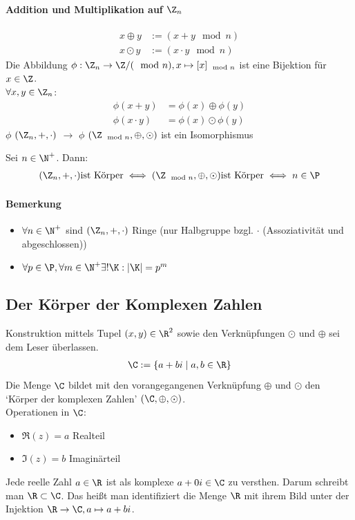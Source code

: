 \paragraph{Addition und Multiplikation auf $\Z_n$}
\begin{align*}
	x\oplus y&:= (x+y\mod n)\\
	x\odot y&:= (x\cdot y\mod n)
\end{align*}
Die Abbildung $\phi: \Z_n\to \Z/(\mod n), x \mapsto [x]_{\mod n}$ ist eine Bijektion für $x \in \Z$.\\
$\forall x,y \in \Z_n$:
\begin{align*}
	\phi(x+y)&=\phi(x)\oplus\phi(y)\\
	\phi(x\cdot y)&=\phi(x)\odot\phi(y)
\end{align*}
$\phi$ $(\Z_n, +, \cdot)$ $\to$ $\phi$ $(\Z_{\mod n}, \oplus, \odot)$ ist ein Isomorphismus
\begin{theorem}
	Sei $n\in\N^+$. Dann:
	\begin{align*}
		(\Z_n,+,\cdot) \text{ist Körper} \iff (\Z_{\mod n}, \oplus, \odot) \text{ist Körper} \iff n\in\P
	\end{align*}
\end{theorem}
\paragraph{Bemerkung}
\begin{itemize}
	\item $\forall n \in \N^+$ sind $(\Z_n,+,\cdot)$ Ringe (nur Halbgruppe bzgl. $\cdot$ (Assoziativität und abgeschlossen))
	\item $\forall p \in \P, \forall m \in \N^+ \exists! \K: |\K|=p^m$
\end{itemize}
\subsection{Der Körper der Komplexen Zahlen}
Konstruktion mittels Tupel $(x,y)\in \R^2$ sowie den Verknüpfungen $\odot$ und $\oplus$ sei dem Leser überlassen.
\begin{align*}
	\C := \{a+bi \mid a,b\in \R\}
\end{align*}
Die Menge $\C$ bildet mit den vorangegangenen Verknüpfung $\oplus$ und $\odot$ den `Körper der komplexen Zahlen' $(\C, \oplus, \odot)$.\\
Operationen in $\C$:
\begin{itemize}
	\item $\Re(z)=a$ Realteil
	\item $\Im(z)=b$ Imaginärteil
\end{itemize}
Jede reelle Zahl $a\in\R$ ist als komplexe $a+0i\in\C$ zu versthen. Darum schreibt man $\R \subset \C$. Das heißt man identifiziert die Menge $\R$ mit ihrem Bild unter der Injektion $\R\to\C,a\mapsto a+bi$.
